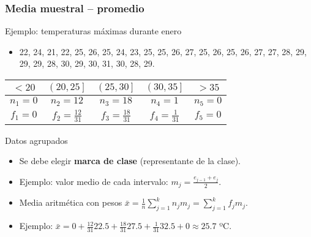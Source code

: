 \documentclass[table]{beamer}
\begin{document}
\begin{frame}
    \frametitle{Media muestral -- promedio}
    \begin{exampleblock}{Ejemplo: temperaturas máximas durante enero}
        \begin{itemize}
            \item 22, 24, 21, 22, 25, 26, 25, 24, 23, 25, 25, 26, 27, 25, 26, 25, 26, 27, 27, 28, 29, 29, 29, 28, 30, 29, 30, 31, 30, 28, 29.
        \end{itemize}
        \begin{center}
            \begin{tabular}{c|c|c|c|c}
                $< 20$ & $\left ( 20 , 25 \right ]$ & $\left ( 25 , 30 \right ]$ & $\left ( 30 , 35 \right ]$ & $> 35$ \\
                \hline
                $n_{1} = 0$ & $n_{2} = 12$ & $n_{3} = 18$ & $n_{4} = 1$ & $n_{5} = 0$ \\
                \hline
                $f_{1} = 0$ & $f_{2} = \frac{12}{31}$ & $f_{3} = \frac{18}{31}$ & $f_{4} = \frac{1}{31}$ & $f_{5} = 0$ \\
            \end{tabular}
        \end{center}
    \end{exampleblock}
    \begin{block}{Datos agrupados}
        \begin{itemize}
            \item Se debe elegir \textbf{marca de clase} (representante de la clase).
            \item Ejemplo: valor medio de cada intervalo: $m_{j} = \frac{e_{j - 1} + e_{j}}{2}$.
            \item Media aritmética con pesos $\bar{x} = \frac{1}{n} \sum_{j = 1}^{k} n_{j} m_{j} = \sum_{j = 1}^{k} f_{j} m_{j}$.
            \item Ejemplo: $\bar{x} = 0 + \frac{12}{31} 22.5 + \frac{18}{31} 27.5 + \frac{1}{31} 32.5 + 0 \approx 25.7$ ºC.
        \end{itemize}
    \end{block}
\end{frame}
\end{document}
